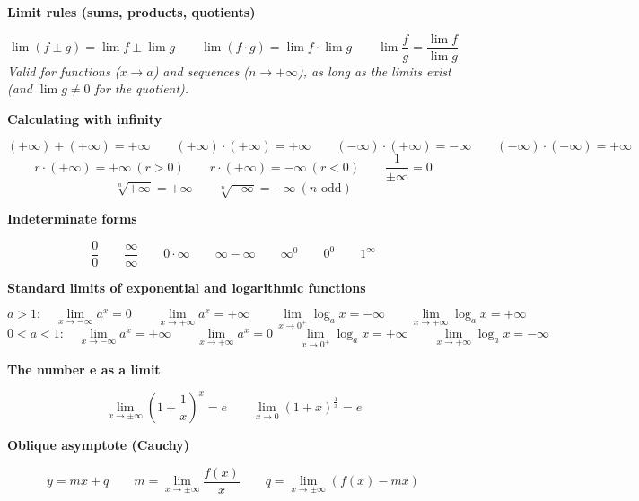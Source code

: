 \documentclass[11pt]{article}
\newcommand{\sub}[1]{\par\medskip\textbf{#1}\par}
\newcommand{\expl}[1]{{\color{gray}\itshape #1}\par}
\begin{document}
\sub{Limit rules (sums, products, quotients)}
\[ \lim (f \pm g) = \lim f \pm \lim g \qquad \lim (f\cdot g) = \lim f\cdot\lim g \qquad \lim \frac{f}{g} = \frac{\lim f}{\lim g} \]
\expl{Valid for functions ($x \to a$) and sequences ($n \to +\infty$), as long as the limits exist (and $\lim g \ne 0$ for the quotient).}

\sub{Calculating with infinity}
\[ (+\infty) + (+\infty) = +\infty \qquad (+\infty)\cdot(+\infty) = +\infty \qquad (-\infty)\cdot(+\infty) = -\infty \qquad (-\infty)\cdot(-\infty) = +\infty \]
\[ r\cdot(+\infty) = +\infty\ (r > 0) \qquad r\cdot(+\infty) = -\infty\ (r < 0) \qquad \frac{1}{\pm\infty} = 0 \]
\[ \sqrt[n]{+\infty} = +\infty \qquad \sqrt[n]{-\infty} = -\infty\ (n \text{ odd}) \]

\sub{Indeterminate forms}
\[ \frac{0}{0} \qquad \frac{\infty}{\infty} \qquad 0\cdot\infty \qquad \infty - \infty \qquad \infty^0 \qquad 0^0 \qquad 1^\infty \]

\sub{Standard limits of exponential and logarithmic functions}
\[ a > 1: \quad \lim_{x\to -\infty} a^x = 0 \qquad \lim_{x\to +\infty} a^x = +\infty \qquad \lim_{x\to 0^+} \log_a x = -\infty \qquad \lim_{x\to +\infty} \log_a x = +\infty \]
\[ 0 < a < 1: \quad \lim_{x\to -\infty} a^x = +\infty \qquad \lim_{x\to +\infty} a^x = 0 \qquad \lim_{x\to 0^+} \log_a x = +\infty \qquad \lim_{x\to +\infty} \log_a x = -\infty \]

\sub{The number e as a limit}
\[ \lim_{x\to \pm\infty} \left(1 + \frac{1}{x}\right)^x = e \qquad \lim_{x\to 0} (1 + x)^{\frac{1}{x}} = e \]

\sub{Oblique asymptote (Cauchy)}
\[ y = mx + q \qquad m = \lim_{x\to \pm\infty} \frac{f(x)}{x} \qquad q = \lim_{x\to \pm\infty} \left(f(x) - mx\right) \]
\end{document}
